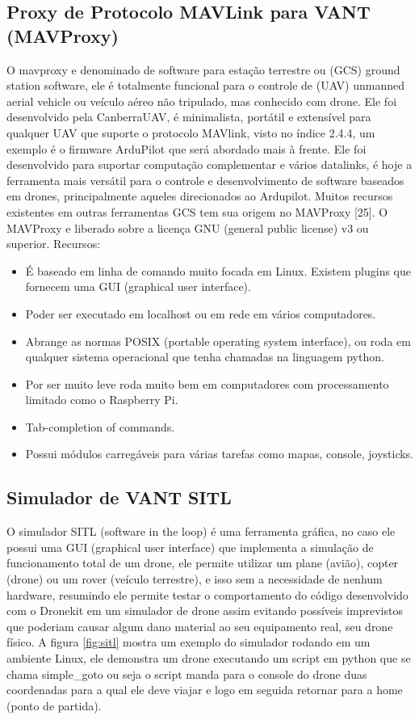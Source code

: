\subsection{Proxy de Protocolo MAVLink para VANT (MAVProxy)}
O mavproxy e denominado de software para estação terrestre ou (GCS) ground station software, ele é totalmente funcional para o controle de (UAV) unmanned aerial vehicle ou veículo aéreo não tripulado, mas conhecido com drone. Ele foi desenvolvido pela CanberraUAV, é minimalista, portátil e extensível para qualquer UAV que suporte o protocolo MAVlink, visto no índice 2.4.4, um exemplo é o firmware ArduPilot que será abordado mais à frente. Ele foi desenvolvido para suportar computação complementar e vários datalinks, é hoje a ferramenta mais versátil para o controle e desenvolvimento de software baseados em drones, principalmente aqueles direcionados ao Ardupilot. Muitos recursos existentes em outras ferramentas GCS tem sua origem no MAVProxy [25]. O MAVProxy e liberado sobre a licença GNU (general public license) v3 ou superior.
Recursos:
\begin{itemize}
    \item É baseado em linha de comando muito focada em Linux. Existem plugins que fornecem uma GUI (graphical user interface).
    \item Poder ser executado em localhost ou em rede em vários computadores.
    \item Abrange as normas POSIX (portable operating system interface), ou roda em qualquer sistema operacional que tenha chamadas na linguagem python.
    \item Por ser muito leve roda muito bem em computadores com processamento limitado como o Raspberry Pi.
    \item Tab-completion of commands.
    \item Possui módulos carregáveis para várias tarefas como mapas, console, joysticks.
\end{itemize}

\subsection{Simulador de VANT SITL}
O simulador SITL (software in the loop) é uma ferramenta gráfica, no caso ele possui uma GUI (graphical user interface) que implementa a simulação de funcionamento total de um drone, ele permite utilizar um plane (avião), copter (drone) ou um rover (veículo terrestre), e isso sem a necessidade de nenhum hardware, resumindo ele permite testar o comportamento do código desenvolvido com o Dronekit em um simulador de drone assim evitando possíveis imprevistos que poderiam causar algum dano material ao seu equipamento real, seu drone físico. A figura \ref{fig:sitl} mostra um exemplo do simulador rodando em um ambiente Linux, ele demonstra um drone executando um script em python que se chama simple\_goto ou seja o script manda para o console do drone duas coordenadas para a qual ele deve viajar e logo em seguida retornar para a home (ponto de partida).


